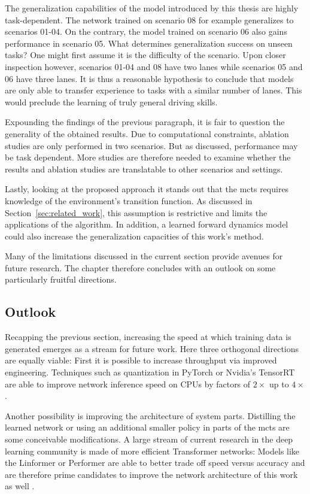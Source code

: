 The generalization capabilities of the model introduced by this thesis are highly task-dependent. The network trained on scenario 08 for example generalizes to scenarios 01-04. On the contrary, the model trained on scenario 06 also gains performance in scenario 05. What determines generalization success on unseen tasks? One might first assume it is the difficulty of the scenario. Upon closer inspection however, scenarios 01-04 and 08 have two lanes while scenarios 05 and 06 have three lanes. It is thus a reasonable hypothesis to conclude that models are only able to transfer experience to tasks with a similar number of lanes. This would preclude the learning of truly general driving skills.

Expounding the findings of the previous paragraph, it is fair to question the generality of the obtained results. Due to computational constraints, ablation studies are only performed in two scenarios. But as discussed, performance may be task dependent. More studies are therefore needed to examine whether the results and ablation studies are translatable to other scenarios and settings.

Lastly, looking at the proposed approach it stands out that the \gls{mcts} requires knowledge of the environment's transition function. As discussed in Section~\ref{sec:related_work}, this assumption is restrictive and limits the applications of the algorithm. In addition, a learned forward dynamics model could also increase the generalization capacities of this work's method.

Many of the limitations discussed in the current section provide avenues for future research. The chapter therefore concludes with an outlook on some particularly fruitful directions.

\subsection{Outlook}\label{ssec:outlook}
Recapping the previous section, increasing the speed at which training data is generated emerges as a stream for future work. Here three orthogonal directions are equally viable: First it is possible to increase throughput via improved engineering. Techniques such as quantization in PyTorch \cite{paszkePyTorchImperativeStyle} or Nvidia's TensorRT \cite{nvidiaNVIDIATensorRT2016} are able to improve network inference speed on CPUs by factors of $2 \times$ up to $4 \times$.

Another possibility is improving the architecture of system parts. Distilling the learned network \cite{rusuPolicyDistillation2016} or using an additional smaller policy in parts of the \gls{mcts} \cite{lanMultiplePolicyValue} are some conceivable modifications. A large stream of current research in the deep learning community is made of more efficient Transformer networks: Models like the Linformer or Performer are able to better trade off speed versus accuracy and are therefore prime candidates to improve the network architecture of this work as well \cite{tayLongRangeArena2020}.

